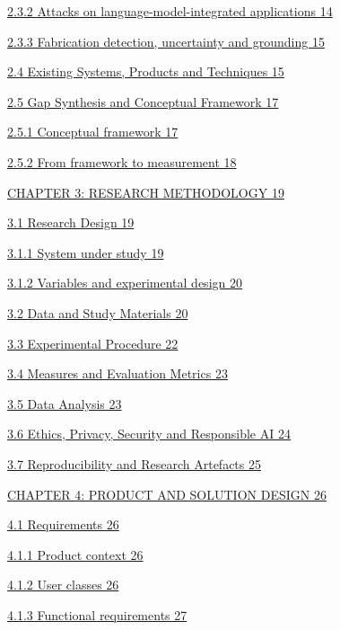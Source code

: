\documentclass[
]{article}
\begin{document}
\protect\hyperlink{attacks-on-language-model-integrated-applications}{2.3.2
Attacks on language-model-integrated applications 14}

\protect\hyperlink{fabrication-detection-uncertainty-and-grounding}{2.3.3
Fabrication detection, uncertainty and grounding 15}

\protect\hyperlink{existing-systems-products-and-techniques}{2.4
Existing Systems, Products and Techniques 15}

\protect\hyperlink{gap-synthesis-and-conceptual-framework}{2.5 Gap
Synthesis and Conceptual Framework 17}

\protect\hyperlink{conceptual-framework}{2.5.1 Conceptual framework 17}

\protect\hyperlink{from-framework-to-measurement}{2.5.2 From framework
to measurement 18}

\protect\hyperlink{chapter-3-research-methodology}{CHAPTER 3: RESEARCH
METHODOLOGY 19}

\protect\hyperlink{research-design}{3.1 Research Design 19}

\protect\hyperlink{system-under-study}{3.1.1 System under study 19}

\protect\hyperlink{variables-and-experimental-design}{3.1.2 Variables
and experimental design 20}

\protect\hyperlink{data-and-study-materials}{3.2 Data and Study
Materials 20}

\protect\hyperlink{experimental-procedure}{3.3 Experimental Procedure
22}

\protect\hyperlink{measures-and-evaluation-metrics}{3.4 Measures and
Evaluation Metrics 23}

\protect\hyperlink{data-analysis}{3.5 Data Analysis 23}

\protect\hyperlink{ethics-privacy-security-and-responsible-ai}{3.6
Ethics, Privacy, Security and Responsible AI 24}

\protect\hyperlink{reproducibility-and-research-artefacts}{3.7
Reproducibility and Research Artefacts 25}

\protect\hyperlink{chapter-4-product-and-solution-design}{CHAPTER 4:
PRODUCT AND SOLUTION DESIGN 26}

\protect\hyperlink{requirements}{4.1 Requirements 26}

\protect\hyperlink{product-context}{4.1.1 Product context 26}

\protect\hyperlink{user-classes}{4.1.2 User classes 26}

\protect\hyperlink{functional-requirements}{4.1.3 Functional
requirements 27}
\end{document}
